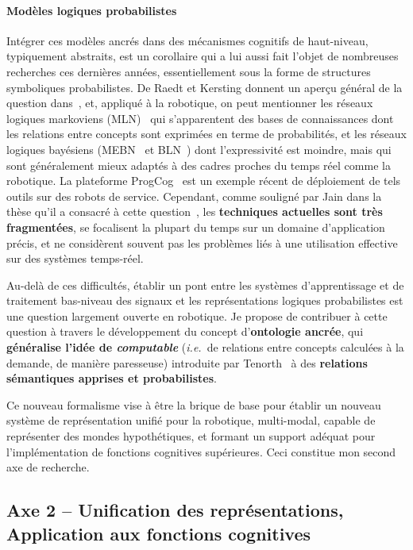 \documentclass[a4paper]{article}
\newcommand{\ie}{{\textit{i.e.~}}}
\begin{document}
\paragraph{Modèles logiques probabilistes}

Intégrer ces modèles ancrés dans des mécanismes cognitifs de
haut-niveau, typiquement abstraits, est un corollaire qui a lui aussi fait
l'objet de nombreuses recherches ces dernières années, essentiellement sous la
forme de structures symboliques probabilistes. De Raedt et Kersting donnent un
aperçu général de la question dans~\cite{deraedt2008probabilistic}, et, appliqué
à la robotique, on peut mentionner les réseaux logiques markoviens
(MLN)~\cite{richardson2006markov} qui s'apparentent des bases de connaissances
dont les relations entre concepts sont exprimées en terme de probabilités, et
les réseaux logiques bayésiens (MEBN~\cite{laskey2008mebn} et
BLN~\cite{jain2009bayesian}) dont l'expressivité est moindre, mais qui sont
généralement mieux adaptés à des cadres proches du temps réel comme la
robotique. La plateforme {\sc ProgCog}~\cite{jain2009equipping} est un exemple
récent de déploiement de tels outils sur des robots de service. Cependant, comme
souligné par Jain dans la thèse qu'il a consacré à cette
question~\cite{jain2012probabilistic}, les \textbf{techniques actuelles sont
très fragmentées}, se focalisent la plupart du temps sur un domaine
d'application précis, et ne considèrent souvent pas les problèmes liés à une
utilisation effective sur des systèmes temps-réel.


Au-delà de ces difficultés, établir un pont entre les systèmes d'apprentissage
et de traitement bas-niveau des signaux et les représentations logiques
probabilistes est une question largement ouverte en robotique. Je
propose de contribuer à cette question à travers le développement du concept
d'\textbf{ontologie ancrée}, qui \textbf{généralise l'idée de \emph{computable}}
(\ie de relations entre concepts calculées à la demande, de manière
paresseuse) introduite par Tenorth~\cite{tenorth2009knowrob} à des
\textbf{relations sémantiques apprises et probabilistes}.

Ce nouveau formalisme vise à être la brique de base pour établir un nouveau
système de représentation unifié pour la robotique, multi-modal, capable de
représenter des mondes hypothétiques, et formant un support adéquat pour l'implémentation
de fonctions cognitives supérieures. Ceci constitue mon second axe de recherche.

\subsection*{Axe 2 -- Unification des représentations, Application aux fonctions
cognitives}
\end{document}
